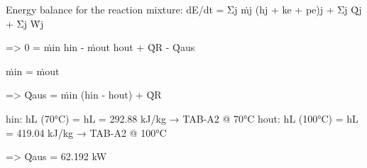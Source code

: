 Energy balance for the reaction mixture:  
dE/dt = Σj ṁj (hj + ke + pe)j + Σj Q̇j + Σj Ẇj  

=> 0 = ṁin hin - ṁout hout + Q̇R - Q̇aus  

ṁin = ṁout  

=> Q̇aus = ṁin (hin - hout) + Q̇R  

hin: hL (70°C) = hL = 292.88 kJ/kg → TAB-A2 @ 70°C  
hout: hL (100°C) = hL = 419.04 kJ/kg → TAB-A2 @ 100°C  

=> Q̇aus = 62.192 kW